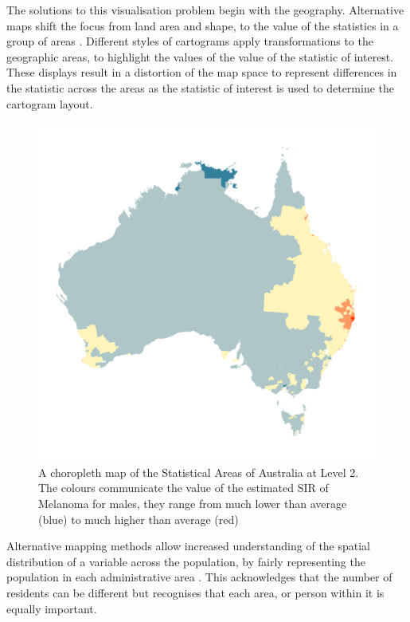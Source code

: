 The solutions to this visualisation problem begin with the geography.
Alternative maps shift the focus from land area and shape, to the value
of the statistics in a group of areas \citep{ACCAC}. Different styles of
cartograms apply transformations to the geographic areas, to highlight
the values of the value of the statistic of interest. These displays
result in a distortion of the map space to represent differences in the
statistic across the areas \citep{ACCAC} as the statistic of interest is
used to determine the cartogram layout.

\begin{figure}[h]
\centering
\includegraphics[width=14cm]{figs/aus_melanoma_p.png}
\caption{\label{fig:melanoma-geo}A choropleth map of the Statistical Areas of Australia at Level 2. The colours communicate the value of the estimated SIR of Melanoma for males, they range from much lower than average (blue) to much higher than average (red)}
\end{figure}

Alternative mapping methods allow increased understanding of the spatial
distribution of a variable across the population, by fairly representing
the population in each administrative area \citep{TAAM}. This
acknowledges that the number of residents can be different but
recognises that each area, or person within it is equally important.

